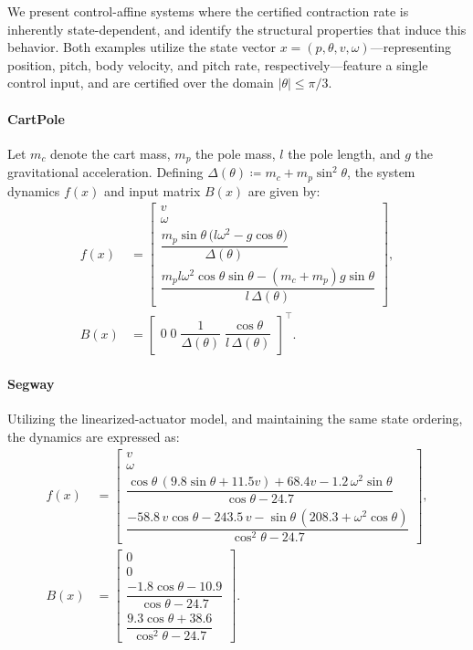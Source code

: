 \documentclass[lettersize,journal]{IEEEtran}
\begin{document}
We present control-affine systems where the certified contraction rate is inherently state-dependent, and identify the structural properties that induce this behavior. 
Both examples utilize the state vector $x = (p, \theta, v, \omega)$—representing position, pitch, body velocity, and pitch rate, respectively—feature a single control input, and are certified over the domain $|\theta| \le \pi/3$.

\paragraph{CartPole}
Let $m_c$ denote the cart mass, $m_p$ the pole mass, $l$ the pole length, and $g$ the gravitational acceleration. Defining $\Delta(\theta) \coloneq m_c + m_p \sin^2 \theta$, the system dynamics $f(x)$ and input matrix $B(x)$ are given by:
\begin{equation}
    \begin{aligned}\label{eq:cartpole}
f(x) & =
\begin{bmatrix}
v\\ \omega\\
\dfrac{m_p\sin\theta\,\bigl(l\omega^2-g\cos\theta\bigr)}{\Delta(\theta)}\\
\dfrac{m_pl\omega^2\cos\theta\sin\theta-(m_c+m_p)g\sin\theta}{l\,\Delta(\theta)}
\end{bmatrix},\\
B(x) & =
\begin{bmatrix}
0 \;  0 \; \dfrac{1}{\Delta(\theta)} \; \dfrac{\cos\theta}{l\,\Delta(\theta)}
\end{bmatrix}^\top.
\end{aligned}
\end{equation}  

\paragraph{Segway}
Utilizing the linearized-actuator model, and maintaining the same state ordering, the dynamics are expressed as:
\begin{equation}
    \begin{aligned}\label{eq:segway}
f(x) & =
\begin{bmatrix}
v\\ \omega\\
\dfrac{\cos\theta\,(9.8\sin\theta+11.5v)+68.4v-1.2\,\omega^2\sin\theta}{\cos\theta-24.7}\\
\dfrac{-58.8\,v\cos\theta-243.5\,v-\sin\theta\,(208.3+\omega^2\cos\theta)}{\cos^2\theta-24.7}
\end{bmatrix}, \\
B(x) & =
\begin{bmatrix}
0\\ 0\\
\dfrac{-1.8\cos\theta-10.9}{\cos\theta-24.7}\\
\dfrac{9.3\cos\theta+38.6}{\cos^2\theta-24.7}
\end{bmatrix}.
\end{aligned}
\end{equation}
\end{document}
